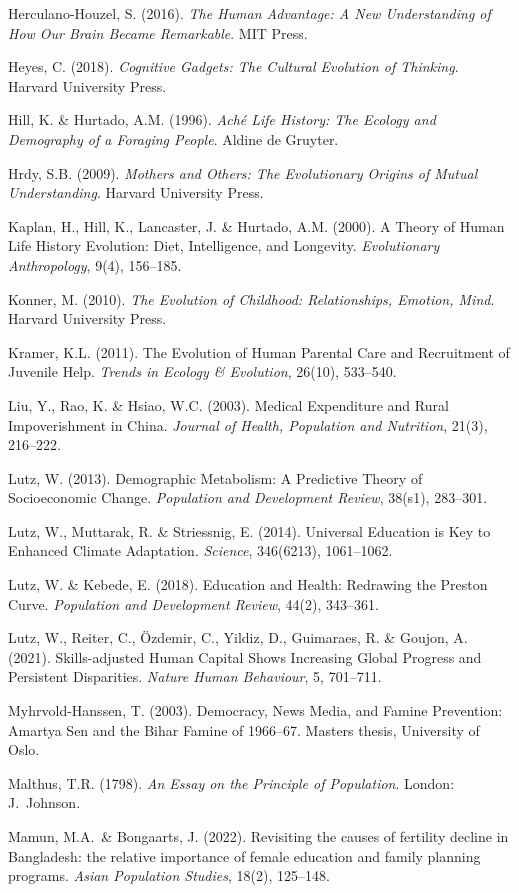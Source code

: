 \documentclass[12pt,letterpaper]{article}
\begin{document}
Herculano-Houzel, S. (2016). \emph{The Human Advantage: A New
Understanding of How Our Brain Became Remarkable}. MIT Press.

Heyes, C. (2018). \emph{Cognitive Gadgets: The Cultural Evolution of
Thinking}. Harvard University Press.

Hill, K. \& Hurtado, A.M. (1996). \emph{Aché Life History: The Ecology
and Demography of a Foraging People}. Aldine de Gruyter.

Hrdy, S.B. (2009). \emph{Mothers and Others: The Evolutionary Origins
of Mutual Understanding}. Harvard University Press.

Kaplan, H., Hill, K., Lancaster, J. \& Hurtado, A.M. (2000). A Theory
of Human Life History Evolution: Diet, Intelligence, and Longevity.
\emph{Evolutionary Anthropology}, 9(4), 156--185.

Konner, M. (2010). \emph{The Evolution of Childhood: Relationships,
Emotion, Mind}. Harvard University Press.

Kramer, K.L. (2011). The Evolution of Human Parental Care and
Recruitment of Juvenile Help. \emph{Trends in Ecology \& Evolution},
26(10), 533--540.

Liu, Y., Rao, K. \& Hsiao, W.C. (2003). Medical Expenditure and Rural
Impoverishment in China. \emph{Journal of Health, Population and
Nutrition}, 21(3), 216--222.

Lutz, W. (2013). Demographic Metabolism: A Predictive Theory of
Socioeconomic Change. \emph{Population and Development Review},
38(s1), 283--301.

Lutz, W., Muttarak, R. \& Striessnig, E. (2014). Universal Education
is Key to Enhanced Climate Adaptation. \emph{Science}, 346(6213),
1061--1062.

Lutz, W. \& Kebede, E. (2018). Education and Health: Redrawing the
Preston Curve. \emph{Population and Development Review}, 44(2),
343--361.

Lutz, W., Reiter, C., Özdemir, C., Yildiz, D., Guimaraes, R. \& Goujon,
A. (2021). Skills-adjusted Human Capital Shows Increasing Global
Progress and Persistent Disparities. \emph{Nature Human Behaviour}, 5,
701--711.

Myhrvold-Hanssen, T. (2003). Democracy, News Media, and Famine
Prevention: Amartya Sen and the Bihar Famine of 1966--67. Masters thesis,
University of Oslo.

Malthus, T.R. (1798). \emph{An Essay on the Principle of Population}.
London: J.~Johnson.

Mamun, M.A.~\& Bongaarts, J. (2022). Revisiting the causes of fertility
decline in Bangladesh: the relative importance of female education and
family planning programs. \emph{Asian Population Studies}, 18(2),
125--148.
\end{document}
